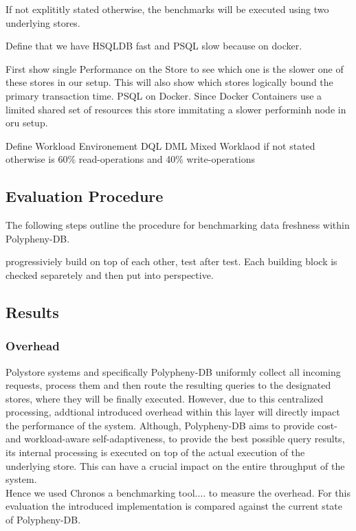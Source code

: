 If not explititly stated otherwise, the benchmarks will be executed using two underlying stores.

Define that we have HSQLDB fast and PSQL slow because on docker.

First show single Performance on the Store to see which one is the slower one of these stores in our setup.
This will also show which stores logically bound the primary transaction time. PSQL on Docker. Since Docker Containers use a limited shared set of resources 
this store immitating a slower performinh node in oru setup.


Define Workload Environement
DQL DML
Mixed Worklaod if not stated otherwise is  60\% read-operations and 40\% write-operations

\subsection{Evaluation Procedure}
The following steps outline the procedure for benchmarking data freshness within Polypheny-DB.


progressiviely build on top of each other, test after test.
Each building block is checked separetely and then put into perspective.


\subsection{Results } 


\subsubsection{Overhead} 
Polystore systems and specifically Polypheny-DB uniformly collect all incoming requests, process them and then
route the resulting queries to the designated stores, where they will be finally executed. 
However, due to this centralized processing, addtional introduced overhead within this layer will directly impact the performance of the system.
Although, Polypheny-DB aims to provide cost- and workload-aware self-adaptiveness, to provide the best possible query results,
its internal processing is executed on top of the actual execution of the underlying store.
This can have a crucial impact on the entire throughput of the system.\\
Hence we used Chronos a benchmarking tool....
to measure the overhead. For this evaluation the introduced implementation is compared against the current state of Polypheny-DB.\\

